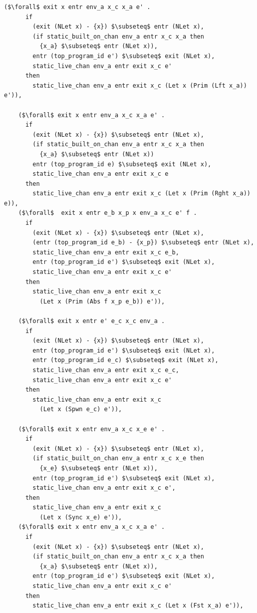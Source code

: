 \documentclass{article}
\begin{document}
\begin{lstlisting}[language=logic, mathescape]
    ($\forall$ exit x entr env_a x_c x_a e' . 
      if
        (exit (NLet x) - {x}) $\subseteq$ entr (NLet x),
        (if static_built_on_chan env_a entr x_c x_a then
          {x_a} $\subseteq$ entr (NLet x)),
        entr (top_program_id e') $\subseteq$ exit (NLet x),
        static_live_chan env_a entr exit x_c e'
      then
        static_live_chan env_a entr exit x_c (Let x (Prim (Lft x_a)) e')),

    ($\forall$ exit x entr env_a x_c x_a e' . 
      if
        (exit (NLet x) - {x}) $\subseteq$ entr (NLet x),
        (if static_built_on_chan env_a entr x_c x_a then
          {x_a} $\subseteq$ entr (NLet x))
        entr (top_program_id e) $\subseteq$ exit (NLet x),
        static_live_chan env_a entr exit x_c e
      then
        static_live_chan env_a entr exit x_c (Let x (Prim (Rght x_a)) e)),
    ($\forall$  exit x entr e_b x_p x env_a x_c e' f . 
      if
        (exit (NLet x) - {x}) $\subseteq$ entr (NLet x),
        (entr (top_program_id e_b) - {x_p}) $\subseteq$ entr (NLet x),
        static_live_chan env_a entr exit x_c e_b,
        entr (top_program_id e') $\subseteq$ exit (NLet x),
        static_live_chan env_a entr exit x_c e'
      then
        static_live_chan env_a entr exit x_c
          (Let x (Prim (Abs f x_p e_b)) e')),

    ($\forall$ exit x entr e' e_c x_c env_a .
      if
        (exit (NLet x) - {x}) $\subseteq$ entr (NLet x),
        entr (top_program_id e') $\subseteq$ exit (NLet x),
        entr (top_program_id e_c) $\subseteq$ exit (NLet x),
        static_live_chan env_a entr exit x_c e_c,
        static_live_chan env_a entr exit x_c e'
      then
        static_live_chan env_a entr exit x_c
          (Let x (Spwn e_c) e')),

    ($\forall$ exit x entr env_a x_c x_e e' .
      if
        (exit (NLet x) - {x}) $\subseteq$ entr (NLet x),
        (if static_built_on_chan env_a entr x_c x_e then
          {x_e} $\subseteq$ entr (NLet x)),
        entr (top_program_id e') $\subseteq$ exit (NLet x),
        static_live_chan env_a entr exit x_c e',
      then
        static_live_chan env_a entr exit x_c
          (Let x (Sync x_e) e')),
    ($\forall$ exit x entr env_a x_c x_a e' .
      if
        (exit (NLet x) - {x}) $\subseteq$ entr (NLet x),
        (if static_built_on_chan env_a entr x_c x_a then
          {x_a} $\subseteq$ entr (NLet x)),
        entr (top_program_id e') $\subseteq$ exit (NLet x),
        static_live_chan env_a entr exit x_c e'
      then
        static_live_chan env_a entr exit x_c (Let x (Fst x_a) e')),


\end{lstlisting}
\end{document}
